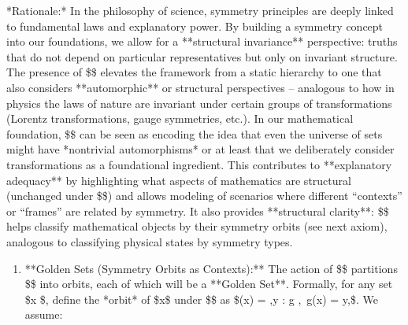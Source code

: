 \documentclass[11pt]{article}
\begin{document}
    *Rationale:* In the philosophy of science, symmetry principles are deeply linked to fundamental laws and explanatory power. By building a symmetry concept into our foundations, we allow for a **structural invariance** perspective: truths that do not depend on particular representatives but only on invariant structure. The presence of \$\Sym\$ elevates the framework from a static hierarchy to one that also considers **automorphic** or structural perspectives – analogous to how in physics the laws of nature are invariant under certain groups of transformations (Lorentz transformations, gauge symmetries, etc.). In our mathematical foundation, \$\Sym\$ can be seen as encoding the idea that even the universe of sets might have *nontrivial automorphisms* or at least that we deliberately consider transformations as a foundational ingredient. This contributes to **explanatory adequacy** by highlighting what aspects of mathematics are structural (unchanged under \$\Sym\$) and allows modeling of scenarios where different “contexts” or “frames” are related by symmetry. It also provides **structural clarity**: \$\Sym\$ helps classify mathematical objects by their symmetry orbits (see next axiom), analogous to classifying physical states by symmetry types.

\begin{enumerate}
  \item **Golden Sets (Symmetry Orbits as Contexts):** The action of \$\Sym\$ partitions \$\infty\$ into orbits, each of which will be a **Golden Set**. Formally, for any set \$x \in \infty\$, define the *orbit* of \$x\$ under \$\Sym\$ as \$\Orb(x) = {,y \in \infty : \exists g \in \Sym,\ g(x) = y,}\$. We assume:
\end{enumerate}
\end{document}
